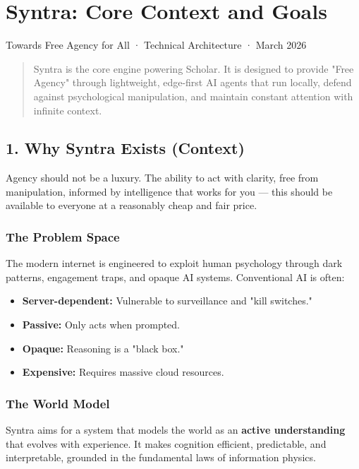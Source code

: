 \documentclass[12pt,a4paper]{article}
\providecommand{\tightlist}{\setlength{\itemsep}{0pt}\setlength{\parskip}{0pt}}
\begin{document}
\section{Syntra: Core Context and
Goals}\label{syntra-core-context-and-goals}

Towards Free Agency for All · Technical Architecture · March 2026

\begin{quote}
Syntra is the core engine powering Scholar. It is designed to provide
"Free Agency" through lightweight, edge-first AI agents that run
locally, defend against psychological manipulation, and maintain
constant attention with infinite context.
\end{quote}

\subsection{1. Why Syntra Exists
(Context)}\label{why-syntra-exists-context}

Agency should not be a luxury. The ability to act with clarity, free
from manipulation, informed by intelligence that works for you --- this
should be available to everyone at a reasonably cheap and fair price.

\subsubsection{The Problem Space}\label{the-problem-space}

The modern internet is engineered to exploit human psychology through
dark patterns, engagement traps, and opaque AI systems. Conventional AI
is often:

\begin{itemize}
\tightlist
\item
  \textbf{Server-dependent:} Vulnerable to surveillance and "kill
  switches."
\item
  \textbf{Passive:} Only acts when prompted.
\item
  \textbf{Opaque:} Reasoning is a "black box."
\item
  \textbf{Expensive:} Requires massive cloud resources.
\end{itemize}

\subsubsection{The World Model}\label{the-world-model}

Syntra aims for a system that models the world as an \textbf{active
understanding} that evolves with experience. It makes cognition
efficient, predictable, and interpretable, grounded in the fundamental
laws of information physics.
\end{document}
